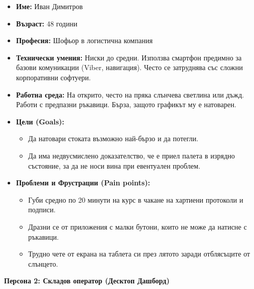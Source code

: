 \documentclass[12pt, a4paper]{article}
\begin{document}
\begin{itemize}
    \item \textbf{Име:} Иван Димитров
    \item \textbf{Възраст:} 48 години
    \item \textbf{Професия:} Шофьор в логистична компания
    \item \textbf{Технически умения:} Ниски до средни. Използва смартфон предимно за базови комуникации (Viber, навигация). Често се затруднява със сложни корпоративни софтуери.
    \item \textbf{Работна среда:} На открито, често на пряка слънчева светлина или дъжд. Работи с предпазни ръкавици. Бърза, защото графикът му е натоварен.
    \item \textbf{Цели (Goals):}
    \begin{itemize}
        \item Да натовари стоката възможно най-бързо и да потегли.
        \item Да има недвусмислено доказателство, че е приел палета в изрядно състояние, за да не носи вина при евентуален проблем.
    \end{itemize}
    \item \textbf{Проблеми и Фрустрации (Pain points):}
    \begin{itemize}
        \item Губи средно по 20 минути на курс в чакане на хартиени протоколи и подписи.
        \item Дразни се от приложения с малки бутони, които не може да натисне с ръкавици.
        \item Трудно чете от екрана на таблета си през лятото заради отблясъците от слънцето.
    \end{itemize}
\end{itemize}

\bigskip
\noindent\textbf{Персона 2: Складов оператор (Десктоп Дашборд)}
\end{document}
